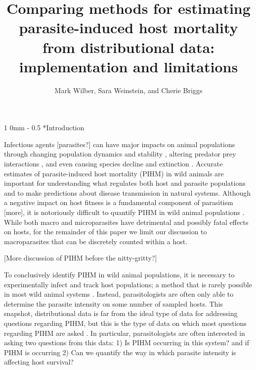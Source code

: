 \documentclass[12pt, a4paper]{article}
\title{Comparing methods for estimating parasite-induced host mortality from distributional data: implementation and limitations}
\author{Mark Wilber, Sara Weinstein, and Cherie Briggs}
\makeatletter
\renewcommand{\section}{\@startsection
{section}%
{1}%
{0mm}%
{-\baselineskip}%
{0.5\baselineskip}%
{\normalfont\bf\large}} %
\makeatother
\begin{document}
\maketitle

\doublespacing

\linenumbers
\section*{Introduction}

Infectious agents [parasites?] can have major impacts on animal populations
through changing population dynamics and stability \citep{Dobson1992}, altering
predator prey interactions \citep{Joly2004}, and even causing species decline
and extinction \citep{DeCastro2005a,McCallum2012b}. Accurate estimates of
parasite-induced host mortality (PIHM) in wild animals are important for
understanding what regulates both host and parasite populations and to make
predictions about disease transmission in natural systems. Although a negative
impact on host fitness is a fundamental component of parasitism
\citep{Lafferty2002} [more], it is notoriously difficult to quantify PIHM in
wild animal populations \citep{Lester1984,McCallum2000a}.  While both macro and
microparasites have detrimental and possibly fatal effects on hosts, for the
remainder of this paper we limit our discussion to macroparasites that can be
discretely counted within a host.

[More discussion of PIHM before the nitty-gritty?]

To conclusively identify PIHM in wild animal populations, it is necessary to
experimentally infect and track host populations; a method that is rarely
possible in most wild animal systems \citep{McCallum2000a}.  Instead, parasitologists
are often only able to determine the parasite intensity on some number of sampled hosts.  This snapshot, distributional data is far from the
ideal type of data for addressing questions regarding PIHM, but this is the type of data on which most questions regarding PIHM are asked \citep[e.g.][]{Ferguson2011,Royce1990,Lanciani1989,Lester1984,Lester1977}.  In particular, parasitologists are often interested in asking two questions from this data: 1) Is PIHM occurring in this system? and if PIHM is occurring 2) Can we quantify the way in which parasite intensity is affecting host survival?
\end{document}
